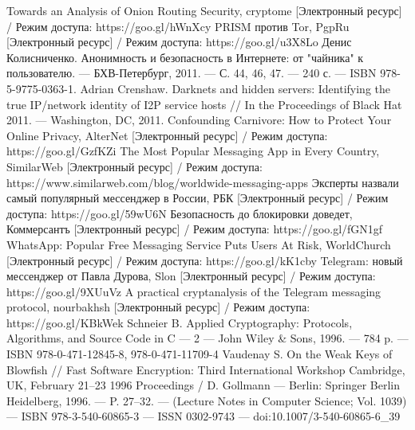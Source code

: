 \begin{thebibliography}{}
	 Towards	an	Analysis	of	Onion	Routing	Security,   cryptome [Электронный ресурс] / Режим доступа: https://goo.gl/hWnXcy
	  PRISM против Tor,   PgpRu [Электронный ресурс] / Режим доступа: https://goo.gl/u3X8Lo
	  Денис Колисниченко. Анонимность и безопасность в Интернете: от "чайника" к пользователю. — БХВ-Петербург, 2011. — С. 44, 46, 47. — 240 с. — ISBN 978-5-9775-0363-1.
	Adrian Crenshaw. Darknets and hidden servers: Identifying the true IP/network identity of I2P service hosts // In the Proceedings of Black Hat 2011. — Washington, DC, 2011.
	 Confounding Carnivore: How to Protect Your Online Privacy,   AlterNet [Электронный ресурс] / Режим доступа: https://goo.gl/GzfKZi
	 The Most Popular Messaging App in Every Country,   SimilarWeb [Электронный ресурс] / Режим доступа: https://www.similarweb.com/blog/worldwide-messaging-apps
	 Эксперты назвали самый популярный мессенджер в России,   РБК [Электронный ресурс] / Режим доступа: https://goo.gl/59wU6N
	 Безопасность до блокировки доведет,   Коммерсантъ [Электронный ресурс] / Режим доступа: https://goo.gl/fGN1gf
	 WhatsApp: Popular Free Messaging Service Puts Users At Risk,   WorldChurch [Электронный ресурс] / Режим доступа: https://goo.gl/kK1cby
	 Telegram: новый мессенджер от Павла Дурова,   Slon [Электронный ресурс] / Режим доступа: https://goo.gl/9XUuVz
	 A   practical   cryptanalysis   of   the	Telegram   messaging   protocol,   nourbakhsh [Электронный ресурс] / Режим доступа: https://goo.gl/KBkWek
	 Schneier B. Applied Cryptography: Protocols, Algorithms, and Source Code in C — 2 — John Wiley \& Sons, 1996. — 784 p. — ISBN 978-0-471-12845-8, 978-0-471-11709-4
	 Vaudenay S. On the Weak Keys of Blowfish // Fast Software Encryption: Third International Workshop Cambridge, UK, February 21–23 1996 Proceedings / D. Gollmann — Berlin: Springer Berlin Heidelberg, 1996. — P. 27–32. — (Lecture Notes in Computer Science; Vol. 1039) — ISBN 978-3-540-60865-3 — ISSN 0302-9743 — doi:10.1007/3-540-60865-6\_39
\end{thebibliography}